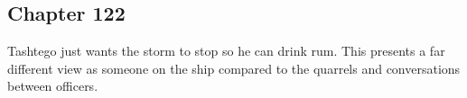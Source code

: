 \subsection{Chapter 122}

Tashtego just wants the storm to stop so he can drink rum. This presents a far
different view as someone on the ship compared to the quarrels and
conversations between officers.
